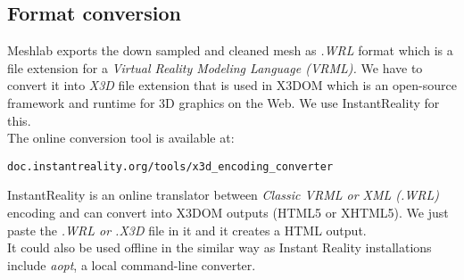 \documentclass[twoside,12pt,a4paper]{article}
\begin{document}
\subsection{Format conversion} %
\label{sub:Format Conversion}
Meshlab exports the down sampled and cleaned mesh as \textit{.WRL}  format which is a file extension for a \textit{Virtual Reality Modeling Language (VRML).} We have to convert it into \textit{X3D} file extension that is used in X3DOM which is an open-source framework and runtime for 3D graphics on the Web. We use InstantReality for this.\\
The online conversion tool is available at: 
\begin{lstlisting} 	 
doc.instantreality.org/tools/x3d_encoding_converter
\end{lstlisting}
InstantReality is an online translator between \textit{Classic VRML or XML (.WRL)} encoding and can convert into X3DOM outputs (HTML5 or XHTML5).   We just paste the \textit{.WRL or .X3D} file in it and it creates a HTML output. \\
It could also be used offline in the similar way as Instant Reality installations include \textit{aopt}, a local command-line converter.

\end{document}
